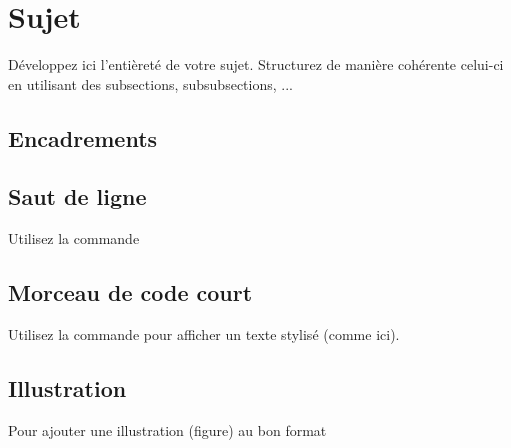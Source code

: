 \section{Sujet}
Développez ici l'entièreté de votre sujet.
Structurez de manière cohérente celui-ci en utilisant des subsections, subsubsections, ...

\subsection{Encadrements}




\subsection{Saut de ligne}

Utilisez la commande 

\subsection{Morceau de code court}

Utilisez la commande  pour afficher un texte stylisé (comme ici).

\subsection{Illustration}

Pour ajouter une illustration (figure) au bon format

